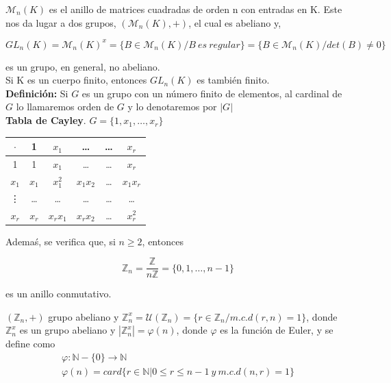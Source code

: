 \documentclass{article}
\begin{document}
$\mathcal{M}_n(K)$ es el anillo de matrices cuadradas de orden n con entradas en K. Este nos da lugar a dos grupos, $(\mathcal{M}_n(K),+)$, el cual es abeliano y,

\begin{equation*}
GL_n(K)=\mathcal{M}_n(K)^x=\{B\in \mathcal{M}_n(K)/B~es~regular\}=\{B\in\mathcal{M}_n(K)/det(B)\neq 0\}
\end{equation*}

es un grupo, en general, no abeliano. \\

Si K es un cuerpo finito, entonces $GL_n(K)$ es también finito. \\

\textbf{Definición:} Si $G$ es un grupo con un número finito de elementos, al cardinal de $G$ lo llamaremos orden de $G$ y lo denotaremos por $|G|$ \\

\textbf{Tabla de Cayley}. $G=\{1,x_1,\ldots,x_r\}$ \\

\begin{tabular}{c|c c c c c}
$\cdot$ & 1 & $x_1$ & \ldots & \ldots & $x_r$ \\
\hline
1 & 1 & $x_1$ & \ldots & \ldots & $x_r$ \\
$x_1$ & $x_1$ & $x_1^2$ & $x_1x_2$ & \ldots & $x_1x_r$ \\
\vdots & \ldots & \ldots & \ldots & \ldots & \ldots \\
$x_r$ & $x_r$ & $x_rx_1$ & $x_rx_2$ & \ldots & $x_r^2$ \\
\end{tabular}

Ademaś, se verifica que, si $n\geq 2$, entonces

\begin{equation*}
\mathbb{Z}_n=\frac{\mathbb{Z}}{n\mathbb{Z}}=\{0,1,\ldots, n-1\}
\end{equation*}

es un anillo conmutativo. 

$(\mathbb{Z}_n, +)$ grupo abeliano y $\mathbb{Z}_n^x=\mathcal{U}(\mathbb{Z}_n)=\{r\in \mathbb{Z}_n/m.c.d(r,n)=1\}$, donde $\mathbb{Z}_n^x$ es un grupo abeliano y $|\mathbb{Z}_n^x|=\varphi(n)$, donde $\varphi$ es la función de Euler, y se define como
\begin{gather*}
\varphi: \mathbb{N}-\{0\} \rightarrow \mathbb{N} \\
\varphi (n)=card\{r \in \mathbb{N} | 0 \leq r \leq n-1~y~m.c.d(n,r)=1\}
\end{gather*}
\end{document}

